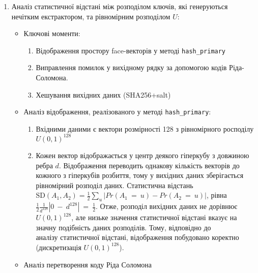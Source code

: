\documentclass[11pt]{article}
\providecommand{\tightlist}{%
      \setlength{\itemsep}{0pt}\setlength{\parskip}{0pt}}
\begin{document}
\begin{enumerate}
\def\labelenumi{\arabic{enumi}.}
\tightlist
\item
  Аналіз статистичної відстані між розподілом ключів, які генеруються
  нечітким екстрактором, та рівномірним розподілом \(U\):

  \begin{itemize}
  \tightlist
  \item
    Ключові моменти:

    \begin{enumerate}
    \def\labelenumii{\arabic{enumii}.}
    \tightlist
    \item
      Відображення простору face-векторів у методі
      \texttt{hash\_primary}
    \item
      Виправлення помилок у вихідному рядку за допомогою кодів
      Ріда-Соломона.
    \item
      Хешування вихідних даних (SHA256+salt)
    \end{enumerate}
  \item
    Аналіз відображення, реалізованого у методі \texttt{hash\_primary}:

    \begin{enumerate}
    \def\labelenumii{\arabic{enumii}.}
    \tightlist
    \item
      Вхідними даними є вектори розмірності 128 з рівномірного росподілу
      \(U(0,1)^{128}\)
    \item
      Кожен вектор відображається у центр деякого гіперкубу з довжиною
      ребра \(d\). Відображення переводить однакову кількість векторів
      до кожного з гіперкубів розбиття, тому у вихідних даних
      зберігається рівномірний розподіл даних. Статистична відстань
      \(\text{SD}(A_1,A_2) = \frac{1}{2}\sum\limits_{u}|Pr(A_1~=~u)-Pr(A_2~=~u)|\),
      рівна \(\frac{1}{2}\frac{1}{d^{128}}|0~-~d^{128}|~=~\frac{1}{2}\).
      Отже, розподіл вихідних даних не дорівнює \(U(0,1)^{128}\), але
      низьке значення статистичної відстані вказує на значну подібність
      даних розподілів. Тому, відповідно до\\
      аналізу статистичної відстані, відображення побудовано коректно
      (дискретизація \(U(0,1)^{128}\)).
    \end{enumerate}
  \item
    Аналіз перетворення коду Ріда Соломона


\end{itemize}
\end{enumerate}
\end{document}
